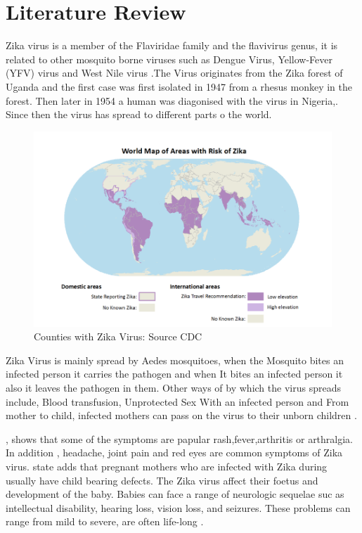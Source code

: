 \chapter{Literature Review}

Zika virus is a member of the Flaviridae family
and the flavivirus genus, it is related to other mosquito borne viruses such as Dengue Virus, Yellow-Fever (YFV) virus  and West Nile virus \citep{doi}.The Virus originates from the Zika forest of Uganda and the first case was first isolated in 1947 from a rhesus monkey in the forest. Then later in 1954 a human was diagonised with the virus in Nigeria,\citep{2015zika}. Since then the virus has spread to different parts o the world. 
\begin{figure}[h!]
\centering
\includegraphics[scale=0.5]{images/map_zika.png} 
\caption{Counties with Zika Virus: Source CDC}\label{fig 1}
\end{figure}


Zika Virus is mainly spread by Aedes mosquitoes, when the Mosquito bites an infected person it carries the pathogen and when It bites an infected person it also it leaves the pathogen in them. Other ways of by which the virus spreads include, Blood transfusion, Unprotected Sex With an infected person and From mother to child, infected mothers can pass on the virus to their unborn children \citep{musso2014}.

\cite{musso2015}, shows that some of the symptoms are papular rash,fever,arthritis or arthralgia. In addition , headache, joint pain and red eyes are common symptoms of Zika virus. \cite{simoes2016zika} state adds that pregnant mothers who are infected with Zika during usually have child bearing defects. The Zika virus affect their foetus and development of the baby. Babies can face a range of neurologic sequelae suc as intellectual disability, hearing loss, vision loss, and seizures. These problems can range from mild to severe, are often life-long \citep{rasmussen2016zika}.

